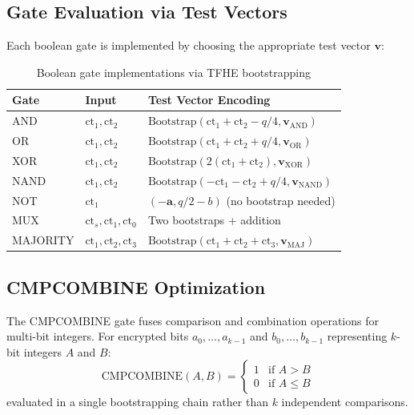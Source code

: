 \subsection{Gate Evaluation via Test Vectors}

Each boolean gate is implemented by choosing the appropriate test vector $\mathbf{v}$:

\begin{table}[h]
\centering
\begin{tabular}{@{}lll@{}}
\toprule
\textbf{Gate} & \textbf{Input} & \textbf{Test Vector Encoding} \\
\midrule
AND & $\text{ct}_1, \text{ct}_2$ & $\text{Bootstrap}(\text{ct}_1 + \text{ct}_2 - q/4, \mathbf{v}_{\text{AND}})$ \\
OR & $\text{ct}_1, \text{ct}_2$ & $\text{Bootstrap}(\text{ct}_1 + \text{ct}_2 + q/4, \mathbf{v}_{\text{OR}})$ \\
XOR & $\text{ct}_1, \text{ct}_2$ & $\text{Bootstrap}(2(\text{ct}_1 + \text{ct}_2), \mathbf{v}_{\text{XOR}})$ \\
NAND & $\text{ct}_1, \text{ct}_2$ & $\text{Bootstrap}(-\text{ct}_1 - \text{ct}_2 + q/4, \mathbf{v}_{\text{NAND}})$ \\
NOT & $\text{ct}_1$ & $(-\mathbf{a}, q/2 - b)$ (no bootstrap needed) \\
MUX & $\text{ct}_s, \text{ct}_1, \text{ct}_0$ & Two bootstraps + addition \\
MAJORITY & $\text{ct}_1, \text{ct}_2, \text{ct}_3$ & $\text{Bootstrap}(\text{ct}_1 + \text{ct}_2 + \text{ct}_3, \mathbf{v}_{\text{MAJ}})$ \\
\bottomrule
\end{tabular}
\caption{Boolean gate implementations via TFHE bootstrapping}
\label{tab:gates}
\end{table}

\subsection{CMPCOMBINE Optimization}

\begin{definition}[CMPCOMBINE]
The CMPCOMBINE gate fuses comparison and combination operations for multi-bit integers.
For encrypted bits $a_0, \ldots, a_{k-1}$ and $b_0, \ldots, b_{k-1}$ representing
$k$-bit integers $A$ and $B$:
\[
\text{CMPCOMBINE}(A, B) = \begin{cases}
1 & \text{if } A > B \\
0 & \text{if } A \leq B
\end{cases}
\]
evaluated in a single bootstrapping chain rather than $k$ independent comparisons.
\end{definition}

